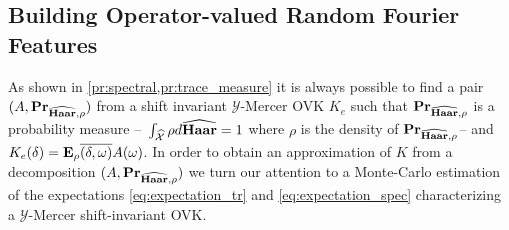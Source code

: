 \subsection{Building Operator-valued Random Fourier Features}
As shown in \cref{pr:spectral,pr:trace_measure} it is always possible to find a pair $(A, {\mathbf{{Pr}}}_{\widehat{\mathbf{Haar}},\rho})$ from a shift invariant $\mathcal{Y}$-Mercer \acl{OVK} $K_e$ such that ${\mathbf{{Pr}}}_{\widehat{\mathbf{Haar}},\rho}$ is a probability measure --\ie~$\int_{\widehat{\mathcal{X}}} \rho d\widehat{\mathbf{Haar}}=1$ where $\rho$ is the density of ${\mathbf{{Pr}}}_{\widehat{\mathbf{Haar}},\rho}$-- and $K_e(\delta)={\mathbf{{E}}}_\rho{\overline{(\delta,\omega)}A(\omega)}$. In order to obtain an approximation of $K$ from a decomposition $(A, {\mathbf{{Pr}}}_{\widehat{\mathbf{Haar}},\rho})$ we turn our attention to a Monte-Carlo estimation of the expectations \cref{eq:expectation_tr} and \cref{eq:expectation_spec} characterizing a $\mathcal{Y}$-Mercer shift-invariant \acl{OVK}.
